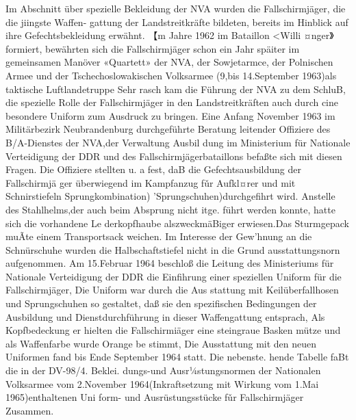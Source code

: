 

Im Abschnitt über spezielle Bekleidung der NVA
wurden die Fallschirmjäger, die die jiingste Waffen-
gattung der Landstreitkräfte bildeten, bereits im
Hinblick auf ihre Gefechtsbekleidung erwähnt. 【m
Jahre 1962 im Bataillon <Willi ¤nger》 formiert,
bewährten sich die Fallschirmjäger schon ein Jahr
späiter im gemeinsamen Manöver «Quartett» der
NVA, der Sowjetarmce, der Polnischen Armee und der Tschechoslowakischen Volksarmee (9,bis
14.September 1963)als taktische Luftlandetruppe
Sehr rasch kam die Führung der NVA zu dem
SchluB, die spezielle Rolle der Fallschirmjäger in
den Landstreitkräften auch durch cine besondere
Uniform zum Ausdruck zu bringen. Eine Anfang
November 1963 im Militärbezirk Neubrandenburg
durchgeführte Beratung leitender Offiziere des
B/A-Dienstes der NVA,der Verwaltung Ausbil
dung im Ministerium für Nationale Verteidigung
der DDR und des Fallschirmjägerbataillons befaßte
sich mit diesen Fragen. Die Offiziere stellten u. a
fest, daB die Gefechtsausbildung der Fallschirmjä
ger überwiegend im Kampfanzug fǔr Aufkl¤rer
und mit Schnirstiefeln
Sprungkombination)
'Sprungschuhen)durchgefihrt wird. Anstelle des
Stahlhelms,der auch beim Absprung nicht itge.
führt werden konnte, hatte sich die vorhandene Le
derkopfhaube alszweckmäBiger erwiesen.Das
Sturmgepack muÃte einem Transportsack weichen.
Im Interesse der Gew'hnung an die Schnürschuhe
wurden die Halbschaftstiefel nicht in die Grund
ausstattungsnorn aufgenommen.
Am 15.Februar 1964 beschloß die Leitung des
Ministeriums für Nationale Verteidigung der DDR
die Einfihrung einer speziellen Uniform für die
Fallschirmjäger, Die Uniform war durch die Aus
stattung mit Keilüberfallhosen und Sprungschuhen
so gestaltet, daß sie den spezifischen Bedingungen
der Ausbildung und Dienstdurchführung in dieser
Waffengattung entsprach, Als Kopfbedeckung er
hielten die Fallschirmiäger eine steingraue Basken
mütze und als Waffenfarbe wurde Orange be
stimmt, Die Ausstattung mit den neuen Uniformen
fand bis Ende September 1964 statt. Die nebenste.
hende Tabelle faBt die in der DV-98/4. Beklei.
dungs-und Ausr¼stungsnormen der Nationalen
Volksarmee vom 2.November 1964(Inkraftsetzung
mit Wirkung vom 1.Mai 1965)enthaltenen Uni
form- und Ausrüstungsstücke fǔr Fallschirmjäger
Zusammen.